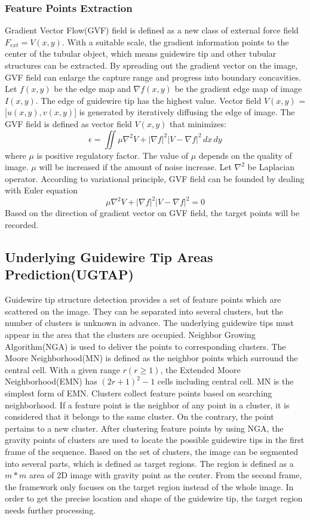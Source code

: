 \documentclass[journal]{IEEEtran}
\begin{document}
\subsubsection{Feature Points Extraction}
Gradient Vector Flow(GVF) field is defined as a new class of external force field $F_{ext} = V(x,y)$. With a suitable scale, the gradient information points to the center of the tubular object, which means guidewire tip and other tubular structures can be extracted.
By spreading out the gradient vector on the image, GVF field can enlarge the capture range and progress into boundary concavities. Let $f(x,y)$ be the edge map and $\nabla$$f(x,y)$ be the gradient edge map of image $I(x,y)$. The edge of guidewire tip has the highest value. Vector field $V(x,y)$ = [$u(x,y),v(x,y)$] is generated by iteratively diffusing the edge of image. The GVF field is defined as vector field $V(x,y)$ that minimizes:
\begin{equation}{
\epsilon = \iint \mu\nabla^{2}V+|\nabla f|^{2}|V-\nabla f|^{2} \,dx \,dy}
\end{equation}
where $\mu$ is positive regulatory factor. The value of $\mu$ depends on the quality of image. $\mu$ will be increased if the amount of noise increase. 
Let $\nabla^{2}$ be Laplacian operator. According to variational principle, GVF field can be founded by dealing with Euler equation
\begin{equation}{
\mu\nabla^{2}V+|\nabla f|^{2}|V-\nabla f|^{2}=0}
\end{equation}
Based on the direction of gradient vector on GVF field, the target points will be recorded.

\subsection{Underlying Guidewire Tip Areas Prediction(UGTAP)}
Guidewire tip structure detection provides a set of feature points which are scattered on the image. They can be separated into several clusters, but the number of clusters is unknown in advance. The underlying guidewire tips must appear in the area that the clusters are occupied. Neighbor Growing Algorithm(NGA) is used to deliver the points to corresponding clusters. The Moore Neighborhood(MN) is defined as the neighbor points which surround the central cell. With a given range $r (r \geq  1)$, the Extended Moore Neighborhood(EMN) has $(2r+1)^2-1$ cells including central cell. MN is the simplest form of EMN.
Clusters collect feature points based on searching neighborhood. If a feature point is the neighbor of any point in a cluster, it is considered that it belongs to the same cluster. On the contrary, the point pertains to a new cluster. After clustering feature points by using NGA, the gravity points of clusters are used to locate the possible guidewire tips in the first frame of the sequence. Based on the set of clusters, the image can be segmented into several parts, which is defined as target regions. The region is defined as a $m*m$ area of 2D image with gravity point as the center. From the second frame, the framework only focuses on the target region instead of the whole image. In order to get the precise location and shape of the guidewire tip, the target region needs further processing.
\end{document}
